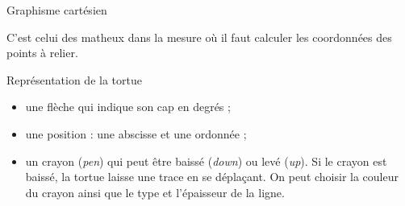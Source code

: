 \documentclass[10pt]{beamer}
\begin{document}
\begin{frame}{Graphisme cartésien}

  C'est celui des matheux dans la mesure où il faut calculer les coordonnées des points à relier.

  \begin{block}{Représentation de la tortue}
    \begin{itemize}
    \item une flèche qui indique son \alert{cap} en degrés ;
    \item une \alert{position} : une abscisse et une ordonnée ;
    \item un \alert{crayon} (\emph{pen}) qui peut être baissé (\emph{down}) ou levé (\emph{up}).
      Si le crayon est baissé, la tortue laisse une trace en se déplaçant.
      On peut choisir la couleur du crayon ainsi que le type et l’épaisseur de la ligne.
  \end{itemize}
\end{block}

\begin{center}
  \end{center}
\end{frame}
\end{document}
